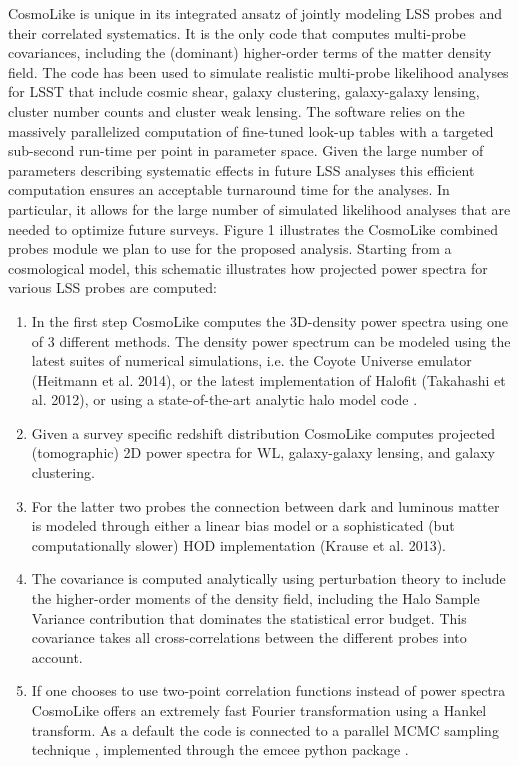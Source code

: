 CosmoLike is unique in its integrated ansatz of jointly modeling LSS probes and their correlated systematics. It is the only code that computes multi-probe covariances, including the (dominant) higher-order terms of the matter density field. The code has been used to simulate realistic multi-probe likelihood analyses for LSST \citep{Krause2017} that include cosmic shear, galaxy clustering, galaxy-galaxy lensing, cluster number counts and cluster weak lensing. 
The software relies on the massively parallelized computation of fine-tuned look-up tables with a targeted sub-second run-time per point in parameter space. Given the large number of parameters describing systematic effects in future LSS analyses this efficient computation ensures an acceptable turnaround time for the analyses. In particular, it allows for the large number of simulated likelihood analyses that are needed to optimize future surveys. Figure 1 illustrates the CosmoLike combined probes module we plan to use for the proposed analysis. Starting from a cosmological model, this schematic illustrates how projected power spectra for various LSS probes are computed: 
\begin{enumerate}
\item In the first step CosmoLike computes the 3D-density power spectra using one of 3 different methods. The density power spectrum can be modeled using the latest suites of numerical simulations, i.e. the Coyote Universe emulator (Heitmann et al. 2014), or the latest implementation of Halofit (Takahashi et al. 2012), or using a state-of-the-art analytic halo model code \citep{Krause2013}. 
\item Given a survey specific redshift distribution CosmoLike computes projected (tomographic) 2D power spectra for WL, galaxy-galaxy lensing, and galaxy clustering.
\item  For the latter two probes the connection between dark and luminous matter is modeled through either a linear bias model or a sophisticated (but computationally slower) HOD implementation (Krause et al. 2013).
\item The covariance is computed analytically using perturbation theory to include the higher-order moments of the density field, including the Halo Sample Variance contribution that dominates the statistical error budget. This covariance takes all cross-correlations between the different probes into account. 
\item If one chooses to use two-point correlation functions instead of power spectra CosmoLike offers an extremely fast Fourier transformation using a Hankel transform. As a default the code is connected to a parallel MCMC sampling technique \citep{Goodman2010}, implemented through the emcee python package \citep{Foreman-Mackey2013}.

\end{enumerate}


